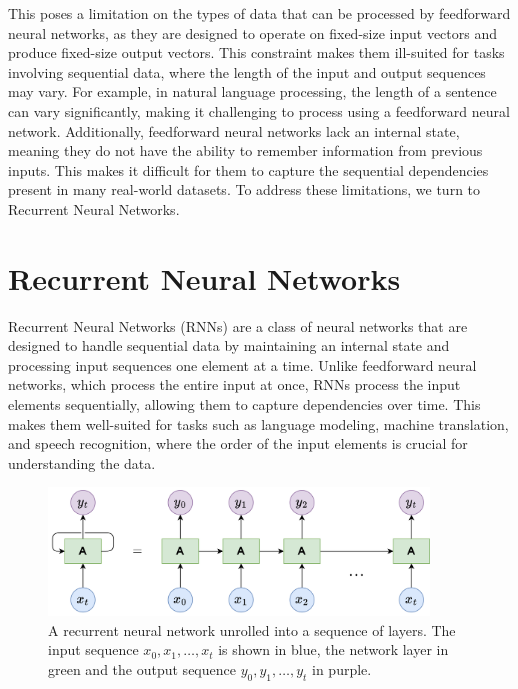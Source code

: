 \documentclass{article}
\begin{document}
This poses a limitation on the types of data that can be processed by feedforward neural
networks, as they are designed to operate on fixed-size input vectors and produce
fixed-size output vectors. This constraint makes them ill-suited for tasks involving
sequential data, where the length of the input and output sequences may vary. For example,
in natural language processing, the length of a sentence can vary significantly, making it
challenging to process using a feedforward neural network. Additionally, feedforward
neural networks lack an internal state, meaning they do not have the ability to remember
information from previous inputs. This makes it difficult for them to capture the
sequential dependencies present in many real-world datasets. To address these limitations,
we turn to Recurrent Neural Networks.



\section{Recurrent Neural Networks}
\label{ch:2}

Recurrent Neural Networks (RNNs) are a class of neural networks that are designed to
handle sequential data by maintaining an internal state and processing input sequences one
element at a time. Unlike feedforward neural networks, which process the entire input at
once, RNNs process the input elements sequentially, allowing them to capture dependencies
over time. This makes them well-suited for tasks such as language modeling, machine
translation, and speech recognition, where the order of the input elements is crucial for
understanding the data.

\begin{figure}[htbp]
  \centering
  \includegraphics[width=0.9\textwidth]{RNN Unrolled.drawio.png}
  \caption{A recurrent neural network unrolled into a sequence of layers. The input
    sequence $x_0, x_1, \ldots, x_t$ is shown in blue, the network layer in green and the
    output sequence $y_0, y_1, \ldots, y_t$ in purple.}
  \label{fig:rnn-unrolled}
\end{figure}
\end{document}
